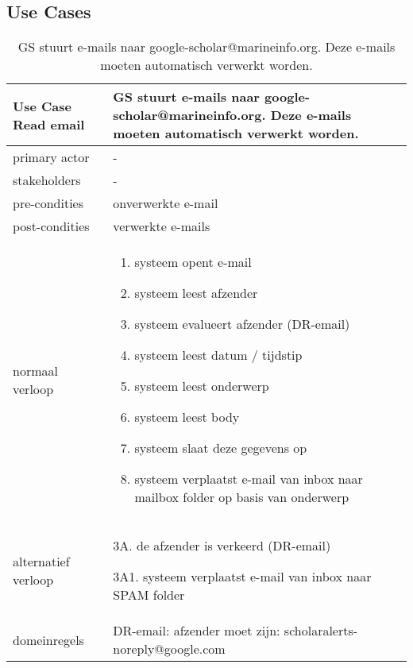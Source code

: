 \subsection{Use Cases}
\begin{table}[ptb]
    \centering
    \begin{tabular}{ | m{5cm} | m{10cm}| } 
        \hline
        \rowcolor{lightgray}
        Use Case Read email & GS stuurt e-mails naar google-scholar@marineinfo.org. Deze e-mails moeten automatisch verwerkt worden. \\ 
        \hline
        primary actor & - \\ 
        \hline
        stakeholders & - \\ 
        \hline
        pre-condities & onverwerkte e-mail \\ 
        \hline
        post-condities & verwerkte e-mails \\ 
        \hline
        normaal verloop & 
        \begin{enumerate}
            \item systeem opent e-mail
            \item systeem leest afzender
            \item systeem evalueert afzender (DR-email)
            \item systeem leest datum / tijdstip
            \item systeem leest onderwerp
            \item systeem leest body
            \item systeem slaat deze gegevens op
            \item systeem verplaatst e-mail van inbox naar mailbox folder op basis van onderwerp
        \end{enumerate} \\ 
        \hline
        alternatief verloop & 
        \begin{description}
            \item 3A. de afzender is verkeerd (DR-email)
            \item 3A1. systeem verplaatst e-mail van inbox naar SPAM folder
        \end{description} \\ 
        \hline
        domeinregels & DR-email: afzender moet zijn: scholaralerts-noreply@google.com \\ 
        \hline
    \end{tabular}
    \caption{GS stuurt e-mails naar google-scholar@marineinfo.org. Deze e-mails moeten automatisch verwerkt worden.}
\end{table}

